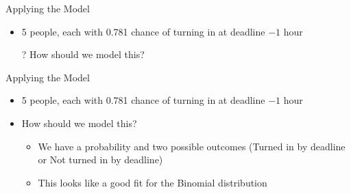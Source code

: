 \documentclass[aspectratio=169]{beamer}
\begin{document}
\begin{frame}{Applying the Model}

\begin{itemize}
	\item 5 people, each with 0.781 chance of turning in at deadline $- 1$ hour
	\item[?] How should we model this?
\end{itemize}


\end{frame}
\begin{frame}{Applying the Model}

\begin{itemize}
	\item 5 people, each with 0.781 chance of turning in at deadline $- 1$ hour
	\item How should we model this?
	\begin{itemize}
	\item We have a probability and two possible outcomes (Turned in by deadline or Not turned in by deadline)
	\item This looks like a good fit for the Binomial distribution
	\end{itemize}
\end{itemize}
\end{frame}
\end{document}
